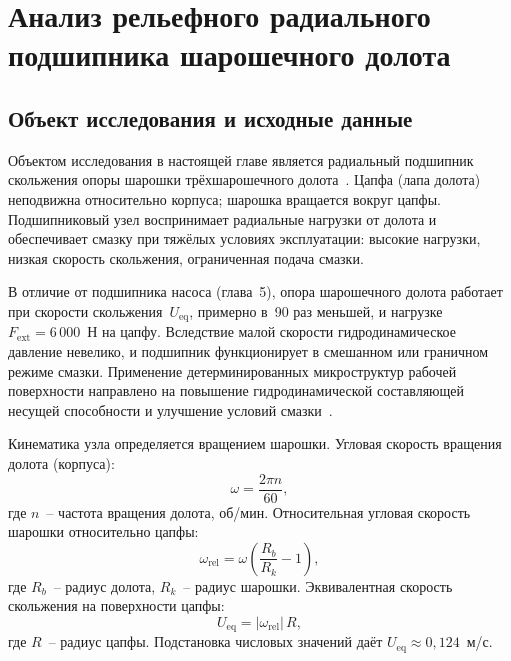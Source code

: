 \chapter{Анализ рельефного радиального подшипника шарошечного долота}

\section{Объект исследования и исходные данные}

Объектом исследования в настоящей главе является радиальный
подшипник скольжения опоры шарошки трёхшарошечного долота~\cite{bashmur2024a,bashmur2024b}.
Цапфа (лапа долота) неподвижна относительно корпуса; шарошка
вращается вокруг цапфы. Подшипниковый узел воспринимает
радиальные нагрузки от долота и обеспечивает смазку при тяжёлых
условиях эксплуатации: высокие нагрузки, низкая скорость
скольжения, ограниченная подача смазки.

В отличие от подшипника насоса (глава~5), опора шарошечного долота
работает при скорости скольжения~$U_{\mathrm{eq}}$, примерно
в~90 раз меньшей, и нагрузке $F_{\mathrm{ext}} = 6\,000$~Н на цапфу. Вследствие малой
скорости гидродинамическое давление невелико, и подшипник
функционирует в смешанном или граничном режиме смазки. Применение
детерминированных микроструктур рабочей поверхности направлено
на повышение гидродинамической составляющей несущей способности
и улучшение условий смазки~\cite{bashmur2022,bashmur2023a,bashmur2023b,guo2005}.

Кинематика узла определяется вращением шарошки. Угловая скорость
вращения долота (корпуса):
\begin{equation}
  \omega = \frac{2\pi n}{60},
  \label{eq:bit_omega}
\end{equation}
где $n$~-- частота вращения долота, об/мин. Относительная угловая
скорость шарошки относительно цапфы:
\begin{equation}
  \omega_{\mathrm{rel}} = \omega
    \left(\frac{R_b}{R_k} - 1\right),
  \label{eq:bit_omega_rel}
\end{equation}
где $R_b$~-- радиус долота, $R_k$~-- радиус шарошки.
Эквивалентная скорость скольжения на поверхности цапфы:
\begin{equation}
  U_{\mathrm{eq}} = |\omega_{\mathrm{rel}}|\, R,
  \label{eq:bit_Ueq}
\end{equation}
где $R$~-- радиус цапфы. Подстановка числовых значений даёт
$U_{\mathrm{eq}} \approx 0{,}124$~м/с.

